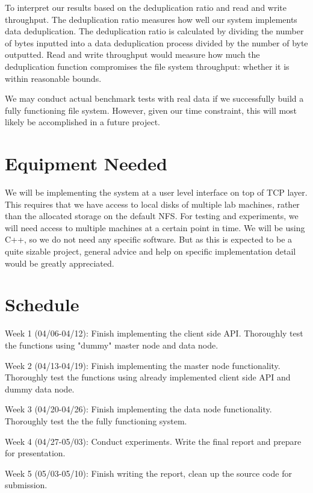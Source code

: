 \documentclass[11pt]{article}
\newenvironment{my_enumerate}{
  \begin{enumerate}
    \setlength{\itemsep}{1pt}
      \setlength{\parskip}{0pt}
\setlength{\parsep}{0pt}}{\end{enumerate}
}
\begin{document}
To interpret our results based on the deduplication ratio and read and write throughput. The deduplication ratio measures how well our system implements data deduplication. The deduplication ratio is calculated by dividing the number of bytes inputted into a data deduplication process divided by the number of byte outputted. Read and write throughput would measure how much the deduplication function compromises the file system throughput: whether it is within reasonable bounds.

We may conduct actual benchmark tests with real data if we successfully build a fully functioning file system. However, given our time constraint, this will most likely be accomplished in a future project.

\section {Equipment Needed}\label{equip}
We will be implementing the system at a user level interface on top of TCP layer. This requires that we have access to local disks of multiple lab machines, rather than the allocated storage on the default NFS. For testing and experiments, we will need access to multiple machines at a certain point in time. We will be using C++, so we do not need any specific software. But as this is expected to be a quite sizable project, general advice and help on specific implementation detail would be greatly appreciated.

\section {Schedule}\label{sched}

\begin{my_enumerate}
  \item Week 1 (04/06-04/12): Finish implementing the client side API. Thoroughly test the functions using "dummy" master node and data node.
  \item Week 2 (04/13-04/19): Finish implementing the master node functionality. Thoroughly test the functions using already implemented client side API and dummy data node.
  \item Week 3 (04/20-04/26): Finish implementing the data node functionality. Thoroughly test the the fully functioning system.
  \item Week 4 (04/27-05/03): Conduct experiments. Write the final report and prepare for presentation.
  \item Week 5 (05/03-05/10): Finish writing the report, clean up the source code for submission.

\end{my_enumerate}
\end{document}
